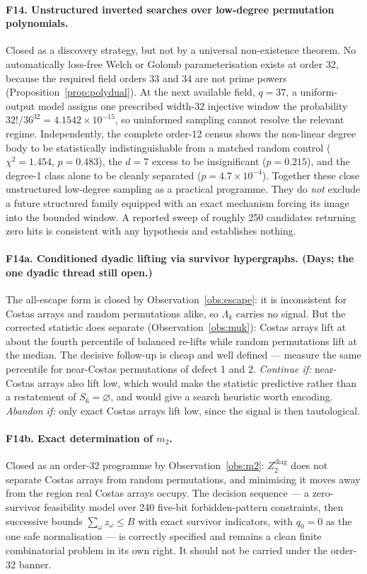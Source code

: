 \documentclass[11pt,a4paper]{article}
\theoremstyle{definition}
\begin{document}
\paragraph{F14. Unstructured inverted searches over low-degree permutation
polynomials.} Closed as a discovery strategy, but not by a universal
non-existence theorem. No automatically loss-free Welch or Golomb
parameterisation exists at order 32, because the required field orders 33 and 34
are not prime powers (Proposition~\ref{prop:polydual}). At the next available
field, $q=37$, a uniform-output model assigns one prescribed width-32 injective
window the probability $32!/36^{32}=4.1542\times10^{-15}$, so uninformed sampling
cannot resolve the relevant regime. Independently, the complete order-12 census
shows the non-linear degree body to be statistically indistinguishable from a
matched random control ($\chi^2=1.454$, $p=0.483$), the $d=7$ excess to be
insignificant ($p=0.215$), and the degree-1 class alone to be cleanly separated
($p=4.7\times10^{-4}$). Together these close unstructured low-degree sampling as
a practical programme. They do \emph{not} exclude a future structured family
equipped with an exact mechanism forcing its image into the bounded window. A
reported sweep of roughly 250 candidates returning zero hits is consistent with
any hypothesis and establishes nothing.

\paragraph{F14a. Conditioned dyadic lifting via survivor hypergraphs. (Days;
the one dyadic thread still open.)} The all-escape form is closed by
Observation~\ref{obs:escape}: it is inconsistent for Costas arrays and random
permutations alike, so $\Lambda_k$ carries no signal. But the corrected statistic
does separate (Observation~\ref{obs:muk}): Costas arrays lift at about the fourth
percentile of balanced re-lifts while random permutations lift at the median. The
decisive follow-up is cheap and well defined --- measure the same percentile for
near-Costas permutations of defect 1 and 2. \emph{Continue if:} near-Costas
arrays also lift low, which would make the statistic predictive rather than a
restatement of $S_6=\varnothing$, and would give a search heuristic worth
encoding. \emph{Abandon if:} only exact Costas arrays lift low, since the signal
is then tautological.

\paragraph{F14b. Exact determination of $m_2$.} Closed as an order-32
programme by Observation~\ref{obs:m2}: $Z_2^{\mathrm{diag}}$ does not separate
Costas arrays from random permutations, and minimising it moves away from the
region real Costas arrays occupy. The decision sequence --- a zero-survivor
feasibility model over 240 five-bit forbidden-pattern constraints, then
successive bounds $\sum_\omega z_\omega\le B$ with exact survivor indicators, with
$q_0=0$ as the one safe normalisation --- is correctly specified and remains a
clean finite combinatorial problem in its own right. It should not be carried
under the order-32 banner.
\end{document}

